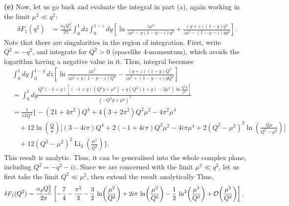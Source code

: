 \documentclass[11pt]{article}
\theoremstyle{definition}
\begin{document}
\textbf{(e)} Now, let us go back and evaluate the integral in part (a), again working in the limit $\mu^2\ll q^2 $:
\begin{equation}
    \begin{aligned}
        \delta F_1(q^2) &= \frac{\alpha_gQ_f^2}{2\pi} \int^1_0dz\int^{1-z}_0 dy\left[\ln{\frac{z\mu^2}{z\mu^2-y(1-y-z)q^2}}+\frac{(y+z)(1-y)q^2}{z\mu^2-(1-y-z)yq^2}\right].
    \end{aligned}
\end{equation}
Note that there are singularities in the region of integration. First, write $Q^2 =  -q^2$, and integrate for $Q^2>0$ (spacelike 4-momentum), which avoids the logarithm having a negative value in it. Thus, integral becomes
\begin{equation}
\begin{aligned}
        &\int^1_0dy\int^{1-y}_0 dz\left[\ln{\frac{z\mu^2}{z\mu^2+y(1-y-z)Q^2}}-\frac{(y+z)(1-y)Q^2}{z\mu^2+(1-y-z)yQ^2}\right]\\
        &=\int^1_0dy\frac{Q^2(-1+y)\left[(-1+y)(Q^2y+\mu^2)+ y(Q^2(1+y)-2\mu^2)\ln\frac{Q^2y}{\mu^2}\right]}{(-Q^2y+\mu^2)^2}\\
        &=
            \frac{1}{12 Q^{4}}\Bigg\{
            - (21 + 4\pi^{2}) Q^{4}
            + 4 (3 + 2\pi^{2}) Q^{2}\mu^{2}
            - 4\pi^{2}\mu^{4}\\
            &\quad + 12 \ln\!\left(\frac{Q}{\mu}\right)\Big[
            (3 - 4 i\pi) Q^{4}
            + 2(-1 + 4 i\pi) Q^{2}\mu^{2}
            - 4 i\pi \mu^{4}
            + 2(Q^{2} - \mu^{2})^{2} \ln\!\left(\frac{Q\mu}{Q^{2} - \mu^{2}}\right)
            \Big]\\
            &\quad + 12 (Q^{2} - \mu^{2})^{2} \operatorname{Li}_{2}\!\left(\frac{\mu^{2}}{Q^{2}}\right)
            \Bigg\}.
\end{aligned}
\end{equation}
This result is analytic. Thus, it can be generalised into the whole complex plane, including $Q^2 = -q^2-i\varepsilon$. Since we are concerned with the limit $\mu^2\ll q^2$, let us first take the limit $Q^2 \ll \mu^2$, then extend the result analytically Thus, 
\begin{equation}
    \begin{aligned}
        \delta F_1(Q^2) &= \frac{\alpha_g Q_f^{2}}{2\pi}\left[
                    -\frac{7}{4}
                    - \frac{\pi^{2}}{3}
                    - \frac{3}{2}\,\ln\!\left(\frac{\mu^{2}}{Q^{2}}\right)
                    + 2 i \pi \,\ln\!\left(\frac{\mu^{2}}{Q^{2}}\right)
                    - \frac{1}{2}\,\ln^{2}\!\left(\frac{\mu^{2}}{Q^{2}}\right) + \order{\frac{\mu^2}{Q^2}}\right].
    \end{aligned}
\end{equation}
\end{document}
